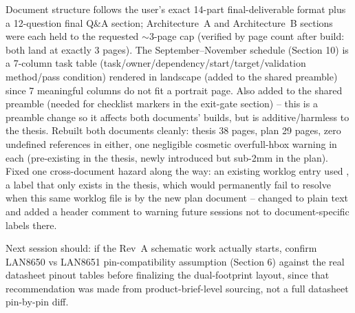 {Document structure follows the user's exact 14-part final-deliverable
format plus a 12-question final Q\&A section; Architecture~A and
Architecture~B sections were each held to the requested $\sim$3-page cap
(verified by page count after build: both land at exactly 3 pages). The
September--November schedule (Section 10) is a 7-column task table
(task/owner/dependency/start/target/validation method/pass condition)
rendered in landscape (added  to the shared preamble) since
7 meaningful columns do not fit a portrait page. Also added 
to the shared preamble (needed for  checklist
markers in the exit-gate section) -- this is a preamble change so it affects
both documents' builds, but is additive/harmless to the thesis. Rebuilt both
documents cleanly: thesis 38 pages, plan 29 pages, zero undefined references
in either, one negligible cosmetic overfull-hbox warning in each (pre-existing
in the thesis, newly introduced but sub-2mm in the plan). Fixed one
cross-document hazard along the way: an existing worklog entry used
, a label that only exists in the
thesis, which would permanently fail to resolve when this same
worklog file is  by the new plan document -- changed to plain
text and added a header comment to  warning
future sessions not to  document-specific labels there.

Next session should: if the Rev~A schematic work actually starts, confirm
LAN8650 vs LAN8651 pin-compatibility assumption (Section 6) against the
real datasheet pinout tables before finalizing the dual-footprint layout,
since that recommendation was made from product-brief-level sourcing, not a
full datasheet pin-by-pin diff.
}

